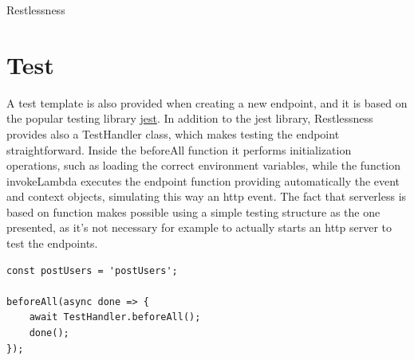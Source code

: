 \begin{chapter}{Restlessness}





    \section{Test}
    A test template is also provided when creating a new endpoint, and it is based
    on the popular testing library \href{https://jestjs.io/}{jest}.
    In addition to the jest library, Restlessness provides also a TestHandler class,
    which makes testing the endpoint straightforward.
    Inside the beforeAll function it performs initialization operations, such as
    loading the correct environment variables, while the function invokeLambda
    executes the endpoint function providing automatically the event and context
    objects, simulating this way an http event. %
    The fact that serverless is based on function makes possible using a simple
    testing structure as the one presented, as it's not necessary for example to
    actually starts an http server to test the endpoints.

    \begin{lstlisting}[caption=index.test.ts template, label={lst:endopints_test_ts}]
const postUsers = 'postUsers';

beforeAll(async done => {
    await TestHandler.beforeAll();
    done();
});


\end{lstlisting}
\end{chapter}
